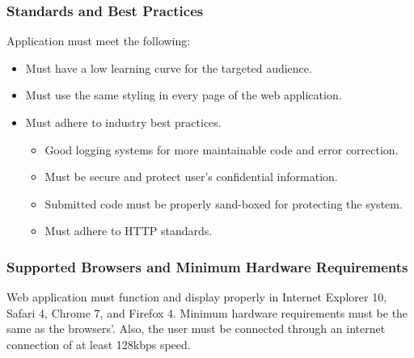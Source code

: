 \label{sec:stand}
\subsubsection{Standards and Best Practices}

Application must meet the following:

\begin{itemize}
\item Must have a low learning curve for the targeted audience.
\item Must use the same styling in every page of the web application.
\item Must adhere to industry best practices.
\begin{itemize}
\item Good logging systems for more maintainable code and error correction.
\item Must be secure and protect user's confidential information.
\item Submitted code must be properly sand-boxed for protecting the system.
\item Must adhere to HTTP standards.
\end{itemize}
\end{itemize}

\subsubsection{Supported Browsers and Minimum Hardware Requirements}

Web application must function and display properly in Internet Explorer 10, 
Safari 4, Chrome 7, and Firefox 4. Minimum hardware requirements must be the same as the browsers'. Also, the user must be connected through an internet connection of at least 128kbps speed.
